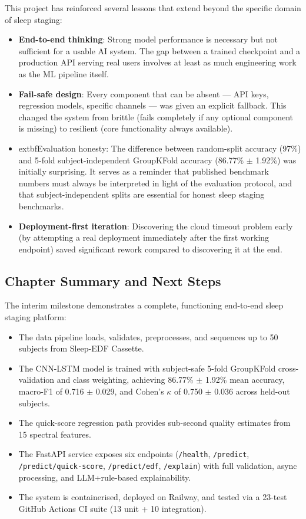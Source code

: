\documentclass[10pt]{article}
\begin{document}
This project has reinforced several lessons that extend beyond the specific domain of sleep staging:

\begin{itemize}
  \item \textbf{End-to-end thinking}: Strong model performance is necessary but not sufficient for a usable AI system. The gap between a trained checkpoint and a production API serving real users involves at least as much engineering work as the ML pipeline itself.
  \item \textbf{Fail-safe design}: Every component that can be absent --- API keys, regression models, specific channels --- was given an explicit fallback. This changed the system from brittle (fails completely if any optional component is missing) to resilient (core functionality always available).
  \item 	extbf{Evaluation honesty}: The difference between random-split accuracy (97\%) and 5-fold subject-independent GroupKFold accuracy (86.77\% $\pm$ 1.92\%) was initially surprising. It serves as a reminder that published benchmark numbers must always be interpreted in light of the evaluation protocol, and that subject-independent splits are essential for honest sleep staging benchmarks.
  \item \textbf{Deployment-first iteration}: Discovering the cloud timeout problem early (by attempting a real deployment immediately after the first working endpoint) saved significant rework compared to discovering it at the end.
\end{itemize}

\subsection{Chapter Summary and Next Steps}
\label{sec:chapterSummary}

The interim milestone demonstrates a complete, functioning end-to-end sleep staging platform:
\begin{itemize}
  \item The data pipeline loads, validates, preprocesses, and sequences up to 50 subjects from Sleep-EDF Cassette.
  \item The CNN-LSTM model is trained with subject-safe 5-fold GroupKFold cross-validation and class weighting, achieving 86.77\% $\pm$ 1.92\% mean accuracy, macro-F1 of 0.716 $\pm$ 0.029, and Cohen's $\kappa$ of 0.750 $\pm$ 0.036 across held-out subjects.
  \item The quick-score regression path provides sub-second quality estimates from 15 spectral features.
  \item The FastAPI service exposes six endpoints (\texttt{/health}, \texttt{/predict}, \texttt{/predict/quick-score}, \texttt{/predict/edf}, \texttt{/explain}) with full validation, async processing, and LLM+rule-based explainability.
  \item The system is containerised, deployed on Railway, and tested via a 23-test GitHub Actions CI suite (13 unit + 10 integration).
\end{itemize}
\end{document}
